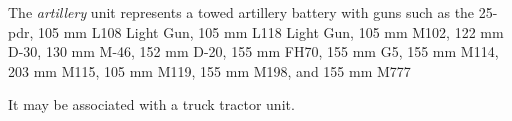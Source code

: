 
The \emph{artillery} unit represents a towed artillery battery with guns such as the 
25-pdr,
105 mm L108 Light Gun, 
105 mm L118 Light Gun, 
105 mm M102, 
122 mm D-30, 
130 mm M-46,
152 mm D-20,
155 mm FH70, 
155 mm G5, 
155 mm M114, 
203 mm M115,
105 mm M119, 
155 mm M198, 
and
155 mm M777

It may be associated with a truck tractor unit.
